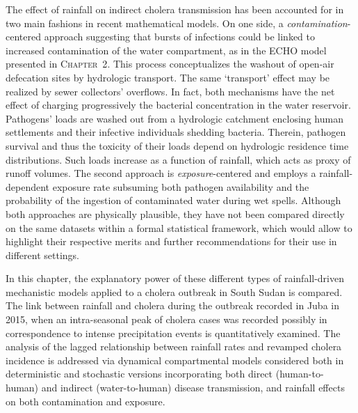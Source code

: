 The effect of rainfall on indirect cholera transmission has been accounted for in two main fashions in recent mathematical models. On one side, a \textit{contamination}-centered approach suggesting that bursts of infections could be linked to increased contamination of the water compartment, as in the ECHO model presented in \textsc{Chapter~2}. This process conceptualizes the washout of open-air defecation sites by hydrologic transport. The same `transport' effect may be realized by sewer collectors' overflows. In fact, both mechanisms have the net effect of charging progressively the bacterial concentration in the water reservoir. Pathogens' loads are washed out from a hydrologic catchment enclosing human settlements and their infective individuals shedding bacteria. Therein, pathogen survival and thus the toxicity of their loads depend on hydrologic residence time distributions. Such loads increase as a function of rainfall, which acts as proxy of runoff volumes. The second approach is \textit{exposure}-centered and employs a rainfall-dependent exposure rate subsuming both pathogen availability and the probability of the ingestion of contaminated water during wet spells. Although both approaches are physically plausible, they have not been compared directly on the same datasets within a formal statistical framework, which would allow to highlight their respective merits and further recommendations for their use in different settings.

In this chapter, the explanatory power of these different types of rainfall-driven mechanistic models applied to a cholera outbreak in South Sudan is compared. The link between rainfall and cholera during the outbreak recorded in Juba in 2015, when an intra-seasonal peak of cholera cases was recorded possibly in correspondence to intense precipitation events is quantitatively examined. The analysis of the lagged relationship between rainfall rates and revamped cholera incidence is addressed via dynamical compartmental models considered both in deterministic and stochastic versions incorporating both direct (human-to-human) and indirect (water-to-human) disease transmission, and rainfall effects on both contamination and exposure.
